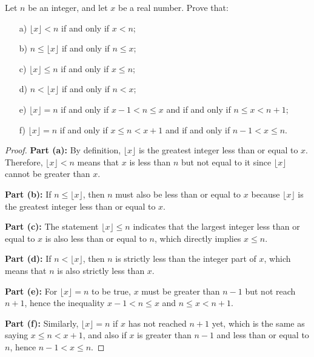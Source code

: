 \documentclass[
	12pt, %
	fleqn, %
	a4paper, %
]{LegrandOrangeBook}
\begin{document}
\begin{exercise}
    Let \( n \) be an integer, and let \( x \) be a real number. Prove that:
\begin{enumerate}
    \item[a)] \( \lfloor x \rfloor < n \) if and only if \( x < n \);
    \item[b)] \( n \leq \lfloor x \rfloor \) if and only if \( n \leq x \);
    \item[c)] \( \lfloor x \rfloor \leq n \) if and only if \( x \leq n \);
    \item[d)] \( n < \lfloor x \rfloor \) if and only if \( n < x \);
    \item[e)] \( \lfloor x \rfloor = n \) if and only if \( x - 1 < n \leq x \) and if and only if \( n \leq x < n + 1 \);
    \item[f)] \( \lfloor x \rfloor = n \) if and only if \( x \leq n < x + 1 \) and if and only if \( n - 1 < x \leq n \).
\end{enumerate}
\end{exercise}
\begin{proof}
    \textbf{Part (a):} By definition, \( \lfloor x \rfloor \) is the greatest integer less than or equal to \( x \). Therefore, \( \lfloor x \rfloor < n \) means that \( x \) is less than \( n \) but not equal to it since \( \lfloor x \rfloor \) cannot be greater than \( x \).
    
    \textbf{Part (b):} If \( n \leq \lfloor x \rfloor \), then \( n \) must also be less than or equal to \( x \) because \( \lfloor x \rfloor \) is the greatest integer less than or equal to \( x \).
    
    \textbf{Part (c):} The statement \( \lfloor x \rfloor \leq n \) indicates that the largest integer less than or equal to \( x \) is also less than or equal to \( n \), which directly implies \( x \leq n \).
    
    \textbf{Part (d):} If \( n < \lfloor x \rfloor \), then \( n \) is strictly less than the integer part of \( x \), which means that \( n \) is also strictly less than \( x \).
    
    \textbf{Part (e):} For \( \lfloor x \rfloor = n \) to be true, \( x \) must be greater than \( n - 1 \) but not reach \( n + 1 \), hence the inequality \( x - 1 < n \leq x \) and \( n \leq x < n + 1 \).
    
    \textbf{Part (f):} Similarly, \( \lfloor x \rfloor = n \) if \( x \) has not reached \( n + 1 \) yet, which is the same as saying \( x \leq n < x + 1 \), and also if \( x \) is greater than \( n - 1 \) and less than or equal to \( n \), hence \( n - 1 < x \leq n \).
    \end{proof}
\end{document}
